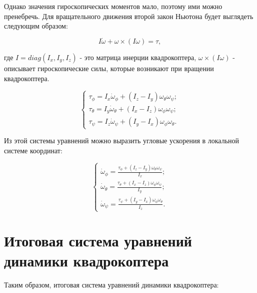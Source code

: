 Однако значения гироскопических моментов мало, поэтому ими можно пренебречь.
Для вращательного движения второй закон Ньютона будет выглядеть следующим образом:

\begin{equation}
I\dot{\omega}+\omega \times (I \omega) = \tau,
\end{equation}

где \(I=diag(I_{x}, I_{y}, I_{z})\) - это матрица инерции квадрокоптера, \(\omega \times (I \omega)\) - описывает гироскопические силы, которые возникают при вращении квадрокоптера.

\begin{equation}
\begin{cases}
    \tau_{\phi} =  I_{x} \dot{\omega}_{\phi} + (I_z-I_y) \omega_{\theta} \omega_{\psi}; \\
    \tau_{\theta} = I_{y} \dot{\omega}_{\theta} + (I_x-I_z) \omega_{\phi} \omega_{\psi}; \\
    \tau_{\psi} = I_{z} \dot{\omega}_{\psi} + (I_y-I_x) \omega_{\phi} \omega_{\theta}.
\end{cases}
\end{equation}

Из этой системы уравнений можно выразить угловые ускорения в локальной системе координат:

\begin{equation}
\begin{cases}
    \dot{\omega}_{\phi} = \frac{\tau_{\phi}+(I_z-I_y) \omega_{\theta} \omega_{\psi}}{I_{x}}; \\
    \dot{\omega}_{\theta} = \frac{\tau_{\theta}+(I_x-I_z) \omega_{\phi} \omega_{\psi}}{I_{y}}; \\
    \dot{\omega}_{\psi} = \frac{\tau_{\psi}+(I_y-I_x) \omega_{\phi} \omega_{\theta}}{I_{z}}.
\end{cases}
\end{equation}

\newpage 

\section{Итоговая система уравнений динамики квадрокоптера}

Таким образом, итоговая система уравнений динамики квадрокоптера:

